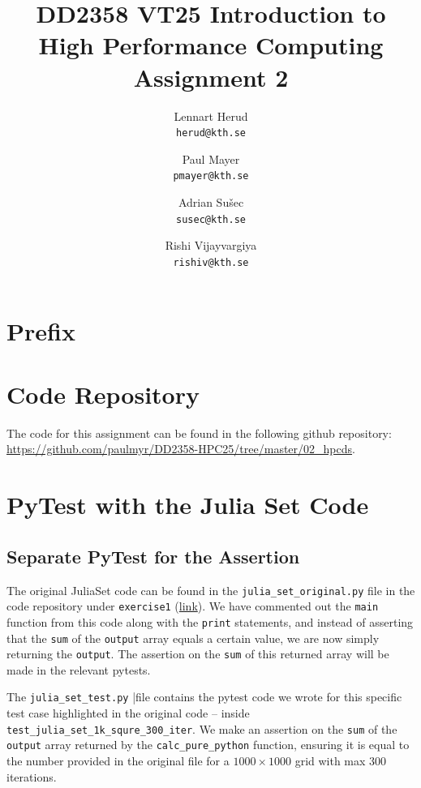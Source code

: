 \documentclass[a4paper,12pt]{article}
\title{
  \normalsize{DD2358 VT25 Introduction to}\\
  \normalsize{High Performance Computing}\\
  \large{Assignment 2}\\
}
\author{
  \small Lennart Herud\\[-0.75ex]
  \scriptsize\texttt{herud@kth.se}
  \and
    \small Paul Mayer\\[-0.75ex]
  \scriptsize\texttt{pmayer@kth.se}
  \and
    \small Adrian Sušec\\[-0.75ex]
  \scriptsize\texttt{susec@kth.se}
  \and
  \small Rishi Vijayvargiya\\[-0.75ex]
  \scriptsize\texttt{rishiv@kth.se}
}
\date{}
\begin{document}
\maketitle
\thispagestyle{firstpagestyle}

\listoftodos

\vspace{1em}

%
\section*{Prefix}

%

\section*{Code Repository}
The code for this assignment can be found in the following github repository:
\url{https://github.com/paulmyr/DD2358-HPC25/tree/master/02_hpcds}.

\section{PyTest with the Julia Set Code}
\subsection{Separate PyTest for the Assertion}
The original JuliaSet code can be found in the \verb|julia_set_original.py| file in the code repository under \verb|exercise1| (\href{https://github.com/paulmyr/DD2358-HPC25/tree/master/02_hpcds/exercise1/julia_set_original.py}{link}). We have commented out the \verb|main| function from this code along with the \verb|print| statements, and instead of asserting that the \verb|sum| of the \verb|output| array equals a certain value, we are now simply returning the \verb|output|. The assertion on the \verb|sum| of this returned array will be made in the relevant pytests. 

The \verb|julia_set_test.py| |file contains the pytest code we wrote for this specific test case highlighted in the original code -- inside \verb|test_julia_set_1k_squre_300_iter|. We make an assertion on the \verb|sum| of the \verb|output| array returned by the \verb|calc_pure_python| function, ensuring it is equal to the number provided in the original file for a $1000 \times 1000$ grid with max 300 iterations. 
\end{document}
